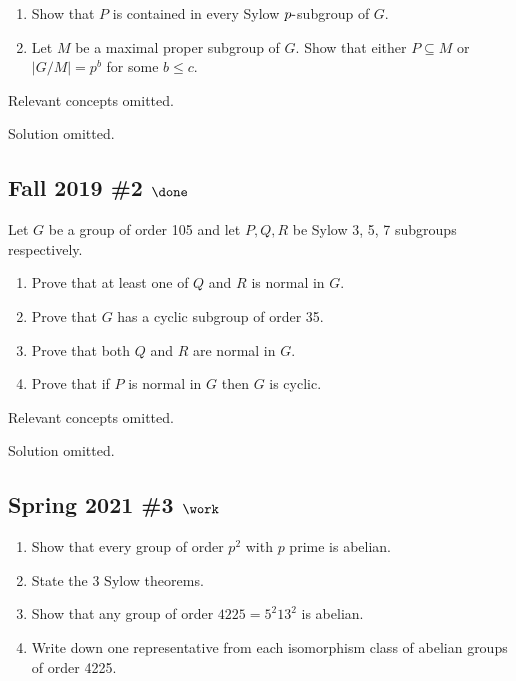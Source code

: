 \begin{enumerate}
\def\labelenumi{\alph{enumi}.}
\item
  Show that \(P\) is contained in every Sylow \(p{\hbox{-}}\)subgroup of
  \(G\).
\item
  Let \(M\) be a maximal proper subgroup of \(G\). Show that either
  \(P \subseteq M\) or \(|G/M | = p^b\) for some \(b \leq c\).
\end{enumerate}

Relevant concepts omitted.

Solution omitted.

\hypertarget{fall-2019-2-done}{%
\subsection{\texorpdfstring{Fall 2019 \#2
\(\done\)}{Fall 2019 \#2 \textbackslash done}}\label{fall-2019-2-done}}

Let \(G\) be a group of order 105 and let \(P, Q, R\) be Sylow 3, 5, 7
subgroups respectively.

\begin{enumerate}
\def\labelenumi{\alph{enumi}.}
\item
  Prove that at least one of \(Q\) and \(R\) is normal in \(G\).
\item
  Prove that \(G\) has a cyclic subgroup of order 35.
\item
  Prove that both \(Q\) and \(R\) are normal in \(G\).
\item
  Prove that if \(P\) is normal in \(G\) then \(G\) is cyclic.
\end{enumerate}

Relevant concepts omitted.

Solution omitted.

\hypertarget{spring-2021-3-work}{%
\subsection{\texorpdfstring{Spring 2021 \#3
\(\work\)}{Spring 2021 \#3 \textbackslash work}}\label{spring-2021-3-work}}

\begin{enumerate}
\def\labelenumi{\alph{enumi}.}
\item
  Show that every group of order \(p^2\) with \(p\) prime is abelian.
\item
  State the 3 Sylow theorems.
\item
  Show that any group of order \(4225 = 5^2 13^2\) is abelian.
\item
  Write down one representative from each isomorphism class of abelian
  groups of order 4225.
\end{enumerate}

